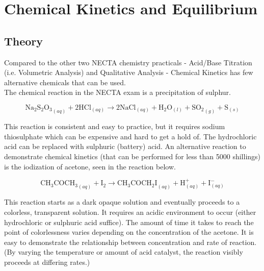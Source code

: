 
\section{Chemical Kinetics and Equilibrium}


\subsection{Theory}
Compared to the other two NECTA chemistry practicals - Acid/Base Titration (i.e. Volumetric Analysis) and Qualitative Analysis - Chemical Kinetics has few alternative chemicals that can be used.\\

The chemical reaction in the NECTA exam is a precipitation of sulphur. 

\[ \mathrm{Na_2S_2O_3}_{(aq)} + \mathrm{2HCl}_{(aq)} \longrightarrow \mathrm{2NaCl}_{(aq)} + \mathrm{H}_{2}\mathrm{O}_{(l)} + \mathrm{SO_2}_{(g)} + \mathrm{S}_{(s)} \]

This reaction is consistent and easy to practice, but it requires sodium thiosulphate which can be expensive and hard to get a hold of. The hydrochloric acid can be replaced with sulphuric (battery) acid. An alternative reaction to demonstrate chemical kinetics (that can be performed for less than 5000 shillings) is the iodization of acetone, seen in the reaction below.

\[ \mathrm{CH_3COCH_3}_{(aq)} + \mathrm{I_2} \longrightarrow \mathrm{CH_3COCH_2I}_{(aq)} + \mathrm{H}^{+}_{(aq)} + \mathrm{I}^{-}_{(aq)} \]

This reaction starts as a dark opaque solution and eventually proceeds to a colorless, transparent solution. It requires an acidic environment to occur (either hydrochloric or sulphuric acid suffice). The amount of time it takes to reach the point of colorlessness varies depending on the concentration of the acetone. It is easy to demonstrate the relationship between concentration and rate of reaction. (By varying the temperature or amount of acid catalyst, the reaction visibly proceeds at differing rates.)

